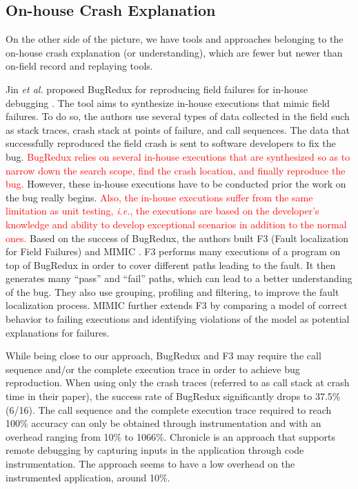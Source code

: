 \documentclass[times, doublespace]{smrauth}
\newcommand{\red}[1]{\textcolor{red}{#1}}
\begin{document}
\subsection{On-house Crash Explanation}

On the other side of the picture, we have tools and approaches belonging to the on-house crash explanation  (or understanding), which are fewer but newer than on-field record and replaying tools.

Jin {\it et al.} proposed BugRedux for reproducing field failures for in-house debugging \cite{Jin2012}.
The tool aims to synthesize in-house executions that mimic field failures.
To do so, the authors use several types of data collected in the field such as stack traces, crash stack at points of failure, and call sequences.
The data that successfully reproduced the field crash is sent to software developers to fix the bug.
\red{BugRedux relies on several in-house executions that are synthesized so as to narrow down the search scope,  find the crash location, and finally reproduce the bug.}
However, these in-house executions have to be conducted prior the work on the bug really begins.
\red{Also, the in-house executions suffer from the same limitation as unit testing, {\it i.e.}, the executions are based on the developer's knowledge and ability to develop exceptional scenarios in addition to the normal ones.}
Based on the success of BugRedux, the authors built F3 (Fault
localization for Field Failures) \cite{Jin2013} and MIMIC \cite{Zuddas2014}. F3 performs many
executions of a program on top of BugRedux in order to cover
different paths leading to the fault.
 It then generates many
``pass'' and ``fail'' paths, which can lead to a better understanding
of the bug. They also use grouping, profiling and filtering, to
improve the fault localization process. MIMIC further extends F3 by comparing a model of correct behavior to failing executions and identifying violations of the model as potential explanations for
failures.

While being close to our approach, BugRedux and F3 may require the call sequence and/or the complete execution trace in order to achieve bug reproduction. When using only the crash traces (referred to as call stack at crash time in their paper), the success rate of BugRedux significantly drops to 37.5\% (6/16). The call sequence and the complete execution trace required to reach 100\% accuracy can only be obtained through instrumentation and with an overhead ranging from 10\% to 1066\%. Chronicle \cite{Bell2013} is an approach that supports remote debugging by capturing inputs in the application through code instrumentation.
The approach seems to have a low overhead on the instrumented application, around 10\%.
\end{document}
